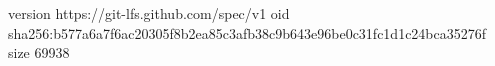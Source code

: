 version https://git-lfs.github.com/spec/v1
oid sha256:b577a6a7f6ac20305f8b2ea85c3afb38c9b643e96be0c31fc1d1c24bca35276f
size 69938
